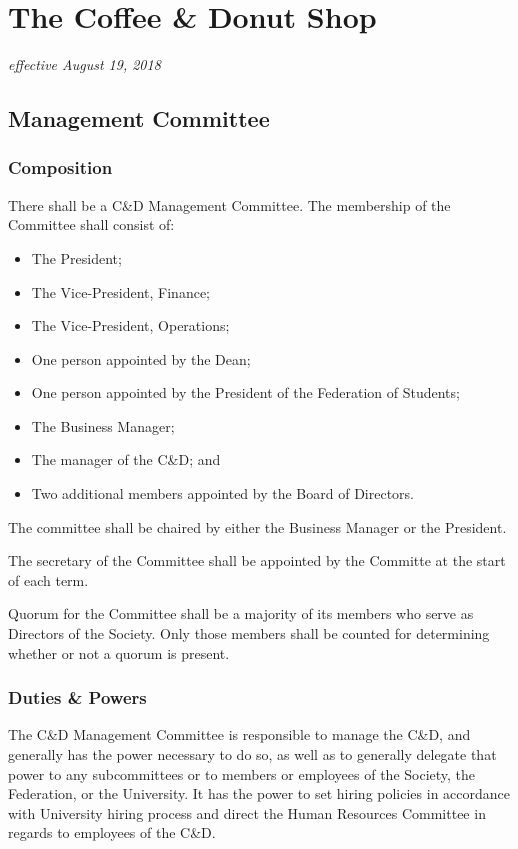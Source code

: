 \section{The Coffee \& Donut Shop}
\emph{effective August 19, 2018}\\

\subsection{Management Committee}
\subsubsection{Composition}
There shall be a C\&D Management Committee. The membership of the Committee shall
consist of:
\begin{itemize}
    \item The President;
    \item The Vice-President, Finance;
    \item The Vice-President, Operations;
    \item One person appointed by the Dean;
    \item One person appointed by the President of
        the Federation of Students; 
    \item The Business Manager;
    \item The manager of the C\&D; and
    \item Two additional members appointed by the Board of Directors.
\end{itemize}

The committee shall be chaired by either the Business Manager or the President.

The secretary of the Committee shall be appointed by the Committe at the start
of each term.

Quorum for the Committee shall be a majority of its members who serve as
Directors of the Society. Only those members shall be counted for determining
whether or not a quorum is present.

\subsubsection{Duties \& Powers}
The C\&D Management Committee is responsible to manage the C\&D, and generally
has the power necessary to do so, as well as to generally delegate that power
to any subcommittees or to members or employees of the Society, the Federation,
or the University. It has the power to set hiring policies in accordance with
University hiring process and direct the Human Resources Committee in regards
to employees of the C\&D.

